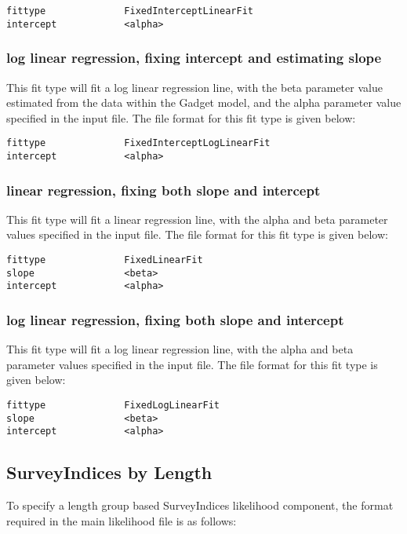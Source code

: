 \documentclass [a4paper, 10pt]{book}
\begin{document}
\begin{verbatim}
fittype              FixedInterceptLinearFit
intercept            <alpha>
\end{verbatim}

\subsubsection{log linear regression, fixing intercept and estimating slope}
This fit type will fit a log linear regression line, with the beta parameter value estimated from the data within the Gadget model, and the alpha parameter value specified in the input file.  The file format for this fit type is given below:

\begin{verbatim}
fittype              FixedInterceptLogLinearFit
intercept            <alpha>
\end{verbatim}

\subsubsection{linear regression, fixing both slope and intercept}
This fit type will fit a linear regression line, with the alpha and beta parameter values specified in the input file.  The file format for this fit type is given below:

\begin{verbatim}
fittype              FixedLinearFit
slope                <beta>
intercept            <alpha>
\end{verbatim}

\subsubsection{log linear regression, fixing both slope and intercept}
This fit type will fit a log linear regression line, with the alpha and beta parameter values specified in the input file.  The file format for this fit type is given below:

\begin{verbatim}
fittype              FixedLogLinearFit
slope                <beta>
intercept            <alpha>
\end{verbatim}

\subsection{SurveyIndices by Length}\label{subsec:sibylength}
To specify a length group based SurveyIndices likelihood component, the format required in the main likelihood file is as follows:
\end{document}
